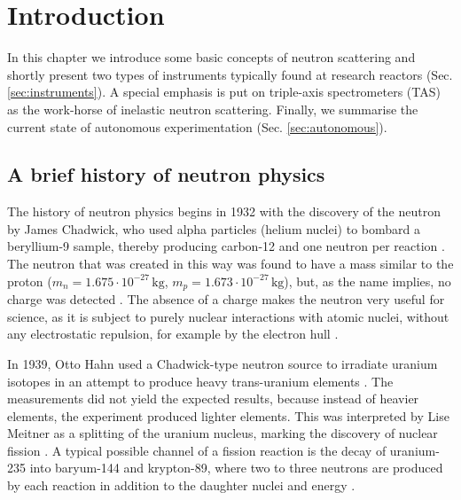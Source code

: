 %
%

\chapter{Introduction}
\label{ch:intro}

In this chapter we introduce some basic concepts of neutron scattering and shortly present two types of instruments typically found at research reactors (Sec. \ref{sec:instruments}). A special emphasis is put on triple-axis spectrometers (TAS) as the work-horse of inelastic neutron scattering. Finally, we summarise the current state of autonomous experimentation (Sec. \ref{sec:autonomous}).



\section{A brief history of neutron physics \label{sec:neutrons}}

The history of neutron physics begins in 1932 with the discovery of the neutron by James Chadwick, who used alpha particles (helium nuclei) to bombard a beryllium-9 sample, thereby producing carbon-12 and one neutron per reaction \cite[p. 1]{Jacrot2021}. The neutron that was created in this way was found to have a mass similar to the proton ($m_n = 1.675\cdot10^{-27}\,\mathrm{kg}$, $m_p = 1.673\cdot10^{-27}\,\mathrm{kg}$), but, as the name implies, no charge was detected \cite[p. 2]{Squires2012}. The absence of a charge makes the neutron very useful for science, as it is subject to purely nuclear interactions with atomic nuclei, without any electrostatic repulsion, for example by the electron hull \cite[p. 1]{Squires2012}.

In 1939, Otto Hahn used a Chadwick-type neutron source to irradiate uranium isotopes in an attempt to produce heavy trans-uranium elements \cite{wiki_fission}. The measurements did not yield the expected results, because instead of heavier elements, the experiment produced lighter elements. This was interpreted by Lise Meitner as a splitting of the uranium nucleus, marking the discovery of nuclear fission \cite{wiki_fission}. A typical possible channel of a fission reaction is the decay of uranium-235 into baryum-144 and krypton-89, where two to three neutrons are produced by each reaction in addition to the daughter nuclei and energy \cite{wiki_fission}.

